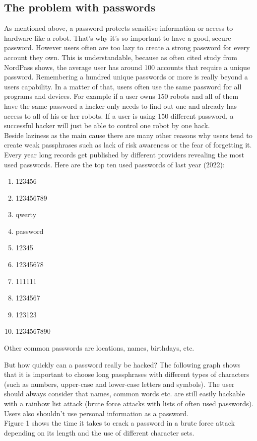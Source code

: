 \documentclass[conference]{IEEEtran}
\begin{document}
\subsection{The problem with passwords}
As mentioned above, a password protects sensitive information or access to hardware like a robot. That's why it's so important to have a good, secure password. However users often are too lazy to create a strong password for every account they own. This is understandable, because as often cited study from NordPass shows, the average user has around 100 accounts that require a unique password. Remembering a hundred unique passwords or more is really beyond a users capability. In a matter of that, users often use the same password for all programs and devices. For example if a user owns 150 robots and all of them have the same password a hacker only needs to find out one and already has access to all of his or her robots. If a user is using 150 different password, a successful hacker will just be able to control one robot by one hack.\cite{b1} \cite{b2}\\
Beside laziness as the main cause there are many other reasons why users tend to create weak passphrases such as lack of risk awareness or the fear of forgetting it.\\
Every year long records get published by different providers revealing the most used passwords. Here are the top ten used passwords of last year (2022): \cite{b3}
\begin{enumerate}
    \item 123456
    \item 123456789
    \item qwerty
    \item password
    \item 12345
    \item 12345678
    \item 111111
    \item 1234567
    \item 123123
    \item 1234567890
\end{enumerate}
Other common passwords are locations, names, birthdays, etc.

But how quickly can a password really be hacked? The following graph shows that it is important to choose long passphrases with different types of characters (such as numbers, upper-case and lower-case letters and symbols). The user should always consider that names, common words etc. are still easily hackable with a rainbow list attack (brute force attacks with lists of often used passwords). Users also shouldn't use personal information as a password.\\
Figure 1 shows the time it takes to crack a password in a brute force attack depending on its length and the use of different character sets.
\end{document}
